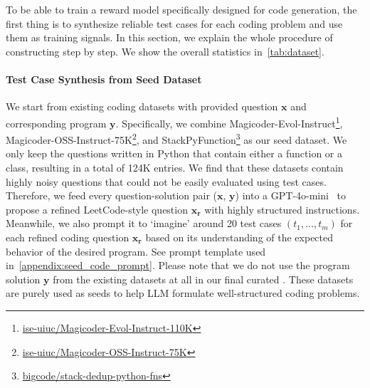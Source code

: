 \section{\dataset{}}
\label{subsec:dataset}
To be able to train a reward model specifically designed for code generation, the first thing is to synthesize reliable test cases for each coding problem and use them as training signals. In this section, we explain the whole procedure of constructing \dataset{} step by step. We show the overall statistics in~\autoref{tab:dataset}. 

\paragraph{Test Case Synthesis from Seed Dataset}
\label{subsecp:test_case_synthesis}
We start from existing coding datasets with provided question $\mathbf{x}$ and corresponding program $\mathbf{y}$. Specifically, we combine Magicoder-Evol-Instruct\footnote{\href{https://huggingface.co/datasets/ise-uiuc/Magicoder-Evol-Instruct-110K}{ise-uiuc/Magicoder-Evol-Instruct-110K}}, Magicoder-OSS-Instruct-75K\footnote{\href{https://huggingface.co/datasets/ise-uiuc/Magicoder-OSS-Instruct-75K}{ise-uiuc/Magicoder-OSS-Instruct-75K}}, and StackPyFunction\footnote{\href{https://huggingface.co/datasets/bigcode/stack-dedup-python-fns}{bigcode/stack-dedup-python-fns}} as our seed dataset. We only keep the questions written in Python that contain either a function or a class, resulting in a total of 124K entries. We find that these datasets contain highly noisy questions that could not be easily evaluated using test cases. Therefore, we feed every question-solution pair ($\mathbf{x}$, $\mathbf{y}$) into a GPT-4o-mini~\citep{gpt4o} to propose a refined LeetCode-style question $\mathbf{x_r}$ with highly structured instructions. Meanwhile, we also prompt it to `imagine' around 20 test cases $(t_1, ..., t_m)$ for each refined coding question $\mathbf{x_r}$ based on its understanding of the expected behavior of the desired program. See prompt template used in~\autoref{appendix:seed_code_prompt}. Please note that we do not use the program solution $\mathbf{y}$ from the existing datasets at all in our final curated \dataset{}. These datasets are purely used as seeds to help LLM formulate well-structured coding problems.

